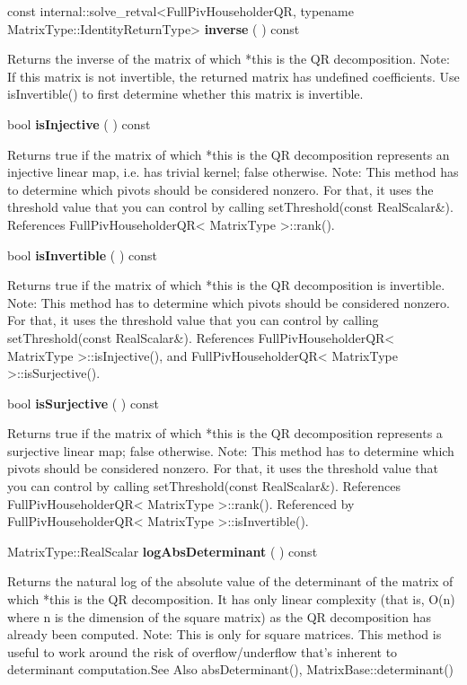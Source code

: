 \vspace{0.3cm}
const internal::solve\_retval<FullPivHouseholderQR, typename MatrixType::IdentityReturnType> \textbf{inverse}  ( )  const 

Returns the inverse of the matrix of which *this is the QR decomposition.
Note: If this matrix is not invertible, the returned matrix has undefined coefficients. Use isInvertible() to first determine whether this matrix is invertible. 


\vspace{0.3cm}
bool \textbf{isInjective}  ( )  const 

Returns true if the matrix of which *this is the QR decomposition represents an injective linear map, i.e. has trivial kernel; false otherwise.
Note: This method has to determine which pivots should be considered nonzero. For that, it uses the threshold value that you can control by calling setThreshold(const RealScalar\&). References FullPivHouseholderQR< MatrixType >::rank().


\vspace{0.3cm}
bool \textbf{isInvertible}  ( )  const 

Returns true if the matrix of which *this is the QR decomposition is invertible.
Note: This method has to determine which pivots should be considered nonzero. For that, it uses the threshold value that you can control by calling setThreshold(const RealScalar\&). References FullPivHouseholderQR< MatrixType >::isInjective(), and FullPivHouseholderQR< MatrixType >::isSurjective().


\vspace{0.3cm}
bool \textbf{isSurjective}  ( )  const 

Returns true if the matrix of which *this is the QR decomposition represents a surjective linear map; false otherwise.
Note: This method has to determine which pivots should be considered nonzero. For that, it uses the threshold value that you can control by calling setThreshold(const RealScalar\&). References FullPivHouseholderQR< MatrixType >::rank().
Referenced by FullPivHouseholderQR< MatrixType >::isInvertible().


\vspace{0.3cm}
MatrixType::RealScalar \textbf{logAbsDeterminant}  ( )  const 

Returns the natural log of the absolute value of the determinant of the matrix of which *this is the QR decomposition. It has only linear complexity (that is, O(n) where n is the dimension of the square matrix) as the QR decomposition has already been computed.
Note: This is only for square matrices.
This method is useful to work around the risk of overflow/underflow that's inherent to determinant computation.See Also
absDeterminant(), MatrixBase::determinant() 


